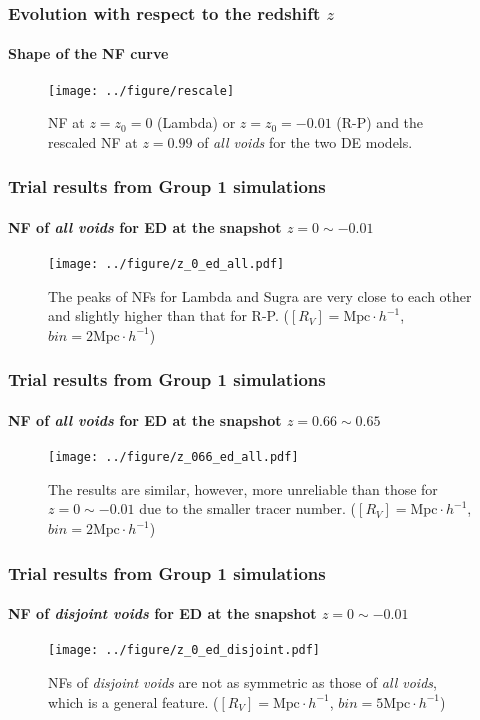 \documentclass{beamer}
\newtheorem{Narrow down the analysis}{Narrow down the analysis}
\begin{document}
\begin{frame}
	\frametitle{Evolution with respect to the redshift $z$}
	\framesubtitle{Shape of the NF curve}
	\pause
	\begin{figure}
\centering
\texttt{[image: ../figure/rescale]}
\caption{NF at $z=z_{0}=0$ (Lambda) or $z=z_{0}=-0.01$ (R-P) and the rescaled NF at $z=0.99$ of \textit{all voids} for the two DE models. }
\label{27}
\end{figure}
\end{frame}

\begin{frame}
	\frametitle{Trial results from Group 1 simulations}
	\framesubtitle{NF of \textit{all voids} for ED at the snapshot $z=0\sim -0.01$}
	\pause
	\begin{figure}
\centering
\texttt{[image: ../figure/z\_0\_ed\_all.pdf]}
\caption{The peaks of NFs for Lambda and Sugra are very close to each other and slightly higher than that for R-P. ($[R_{V}]=\mathrm{Mpc}\cdot h^{-1}$, $bin=2\mathrm{Mpc}\cdot h^{-1}$)}
\label{1}
\end{figure}
\end{frame}

\begin{frame}
	\frametitle{Trial results from Group 1 simulations}
	\framesubtitle{NF of \textit{all voids} for ED at the snapshot $z=0.66\sim 0.65$}
	\pause 
	\begin{figure}
\centering
\texttt{[image: ../figure/z\_066\_ed\_all.pdf]}
\caption{The results are similar, however, more unreliable than those for $z=0\sim -0.01$ due to the smaller tracer number. ($[R_{V}]=\mathrm{Mpc}\cdot h^{-1}$, $bin=2\mathrm{Mpc}\cdot h^{-1}$)}
\label{7}
\end{figure}
\end{frame}

\begin{frame}
	\frametitle{Trial results from Group 1 simulations}
	\framesubtitle{NF of \textit{disjoint voids} for ED at the snapshot $z=0\sim -0.01$}
	\pause 
	\begin{figure}
\centering
\texttt{[image: ../figure/z\_0\_ed\_disjoint.pdf]}
\caption{NFs of \textit{disjoint voids} are not as symmetric as those of \textit{all voids}, which is a general feature. ($[R_{V}]=\mathrm{Mpc}\cdot h^{-1}$, $bin=5\mathrm{Mpc}\cdot h^{-1}$)}
\label{2}
\end{figure}
\end{frame}
\end{document}
